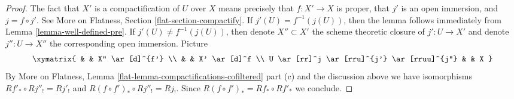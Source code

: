 \begin{proof}
The fact that $X'$ is a compactification of $U$ over $X$ means
precisely that $f : X' \to X$ is proper, that $j'$ is an open immersion,
and $j = f \circ j'$. See
More on Flatness, Section \ref{flat-section-compactify}.
If $j'(U) = f^{-1}(j(U))$, then the lemma follows immediately from
Lemma \ref{lemma-well-defined-pre}.
If $j'(U) \not = f^{-1}(j(U))$, then denote $X'' \subset X'$ the
scheme theoretic closure of $j' : U \to X'$ and denote
$j'' : U \to X''$ the corresponding open immersion.
Picture
$$
\xymatrix{
& & X'' \ar[d]^{f'} \\
& & X' \ar[d]^f \\
U \ar[rr]^j \ar[rru]^{j'} \ar[rruu]^{j''} & & X
}
$$
By
More on Flatness, Lemma \ref{flat-lemma-compactifications-cofiltered} part (c)
and the discussion above we have isomorphisms
$Rf'_* \circ Rj''_! = Rj'_!$ and $R(f \circ f')_* \circ Rj''_! = Rj_!$.
Since $R(f \circ f')_* = Rf_* \circ Rf'_*$ we conclude.
\end{proof}

